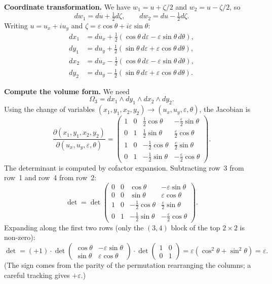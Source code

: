 \textbf{Coordinate transformation.} We have $w_1 = u + \zeta/2$ and $w_2 = u - \zeta/2$, so
\[
dw_1 = du + \tfrac{1}{2}d\zeta, \qquad dw_2 = du - \tfrac{1}{2}d\zeta.
\]
Writing $u = u_x + iu_y$ and $\zeta = \varepsilon\cos\theta + i\varepsilon\sin\theta$:
\begin{align*}
dx_1 &= du_x + \tfrac{1}{2}(\cos\theta\,d\varepsilon - \varepsilon\sin\theta\,d\theta),\\
dy_1 &= du_y + \tfrac{1}{2}(\sin\theta\,d\varepsilon + \varepsilon\cos\theta\,d\theta),\\
dx_2 &= du_x - \tfrac{1}{2}(\cos\theta\,d\varepsilon - \varepsilon\sin\theta\,d\theta),\\
dy_2 &= du_y - \tfrac{1}{2}(\sin\theta\,d\varepsilon + \varepsilon\cos\theta\,d\theta).
\end{align*}

\textbf{Compute the volume form.} We need
\[
\Omega_3 = dx_1\wedge dy_1\wedge dx_2\wedge dy_2.
\]
Using the change of variables $(x_1,y_1,x_2,y_2) \to (u_x,u_y,\varepsilon,\theta)$, the Jacobian is
\[
\frac{\partial(x_1,y_1,x_2,y_2)}{\partial(u_x,u_y,\varepsilon,\theta)} = \begin{pmatrix} 1 & 0 & \frac{1}{2}\cos\theta & -\frac{\varepsilon}{2}\sin\theta \\ 0 & 1 & \frac{1}{2}\sin\theta & \frac{\varepsilon}{2}\cos\theta \\ 1 & 0 & -\frac{1}{2}\cos\theta & \frac{\varepsilon}{2}\sin\theta \\ 0 & 1 & -\frac{1}{2}\sin\theta & -\frac{\varepsilon}{2}\cos\theta \end{pmatrix}.
\]
The determinant is computed by cofactor expansion. Subtracting row~3 from row~1 and row~4 from row~2:
\[
\det = \det\begin{pmatrix} 0 & 0 & \cos\theta & -\varepsilon\sin\theta \\ 0 & 0 & \sin\theta & \varepsilon\cos\theta \\ 1 & 0 & -\frac{1}{2}\cos\theta & \frac{\varepsilon}{2}\sin\theta \\ 0 & 1 & -\frac{1}{2}\sin\theta & -\frac{\varepsilon}{2}\cos\theta \end{pmatrix}.
\]
Expanding along the first two rows (only the $(3,4)$ block of the top $2\times 2$ is non-zero):
\[
\det = (+1)\cdot\det\begin{pmatrix}\cos\theta & -\varepsilon\sin\theta \\ \sin\theta & \varepsilon\cos\theta\end{pmatrix}\cdot\det\begin{pmatrix}1 & 0\\ 0 & 1\end{pmatrix} = \varepsilon(\cos^2\theta + \sin^2\theta) = \varepsilon.
\]
(The sign comes from the parity of the permutation rearranging the columns; a careful tracking gives $+\varepsilon$.)

